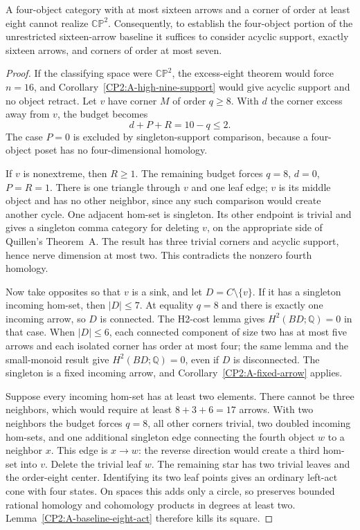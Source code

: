 \begin{proposition}
\label{CP2:A-baseline-four-large}
A four-object category with at most sixteen arrows and a
corner of order at least eight cannot realize $\mathbb{CP}^2$.
Consequently, to establish the four-object portion of the
unrestricted sixteen-arrow baseline it suffices to consider
acyclic support, exactly sixteen arrows, and corners of
order at most seven.
\end{proposition}
\begin{proof}
If the classifying space were $\mathbb{CP}^2$, the
excess-eight theorem would force $n=16$, and
Corollary~\ref{CP2:A-high-nine-support} would give
acyclic support and no object retract.  Let $v$ have
corner $M$ of order $q\geq8$.  With $d$ the corner
excess away from $v$, the budget becomes
\[
 d+P+R=10-q\leq2.
\]
The case $P=0$ is excluded by singleton-support
comparison, because a four-object poset has no
four-dimensional homology.

If $v$ is nonextreme, then $R\geq1$.  The remaining
budget forces $q=8$, $d=0$, $P=R=1$.  There is one
triangle through $v$ and one leaf edge; $v$ is its
middle object and has no other neighbor, since any
such comparison would create another cycle.
One adjacent hom-set is singleton.  Its other
endpoint is trivial and gives a singleton comma
category for deleting $v$, on the appropriate
side of Quillen's Theorem~A.  The result has three
trivial corners and acyclic support, hence nerve
dimension at most two.  This contradicts the
nonzero fourth homology.

Now take opposites so that $v$ is a sink, and let
$D=C\setminus\{v\}$.  If it has a singleton incoming
hom-set, then $|D|\leq7$.  At equality $q=8$ and
there is exactly one incoming arrow, so $D$ is
connected.  The H2-cost lemma gives $H^2(BD;\mathbb Q)=0$
in that case.  When $|D|\leq6$, each connected
component of size two has at most five arrows and
each isolated corner has order at most four;
the same lemma and the small-monoid result give
$H^2(BD;\mathbb Q)=0$, even if $D$ is disconnected.
The singleton is a fixed incoming arrow, and
Corollary~\ref{CP2:A-fixed-arrow} applies.

Suppose every incoming hom-set has at least two
elements.  There cannot be three neighbors, which
would require at least $8+3+6=17$ arrows.
With two neighbors the budget forces $q=8$, all
other corners trivial, two doubled incoming
hom-sets, and one additional singleton edge
connecting the fourth object $w$ to a neighbor
$x$.  This edge is $x\to w$: the reverse direction
would create a third hom-set into $v$.  Delete
the trivial leaf $w$.  The remaining star has
two trivial leaves and the order-eight center.
Identifying its two leaf points gives an ordinary
left-act cone with four states.  On spaces this
adds only a circle, so preserves bounded rational
homology and cohomology products in degrees at
least two.  Lemma~\ref{CP2:A-baseline-eight-act}
therefore kills its square.


\end{proof}
